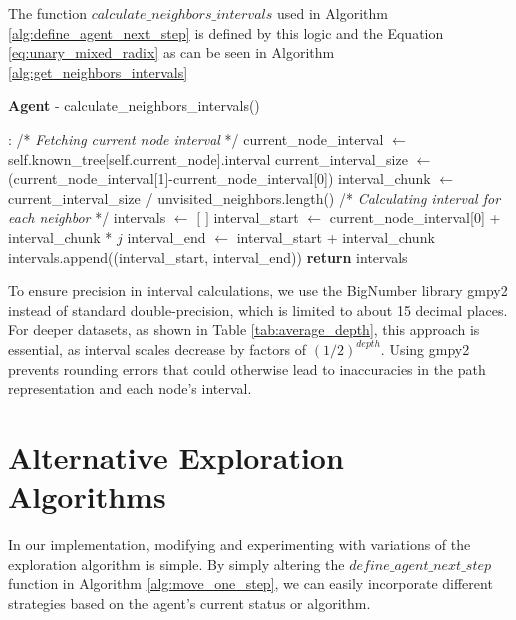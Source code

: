 The function $calculate\_neighbors\_intervals$ used in Algorithm \ref{alg:define_agent_next_step}
is defined by this logic and the Equation \ref{eq:unary_mixed_radix} as can be seen in Algorithm \ref{alg:get_neighbors_intervals}

\begin{algorithm}
\caption{\textbf{Agent} - calculate\_neighbors\_intervals()}
\label{alg:get_neighbors_intervals}
\begin{algorithmic}
    :
    \State /* \textit{Fetching current node interval } */
    \State current\_node\_interval $\gets$ self.known\_tree[self.current\_node].interval
    \State current\_interval\_size $\gets$ (current\_node\_interval[1]-current\_node\_interval[0])
    \State interval\_chunk $\gets$ current\_interval\_size / unvisited\_neighbors.length()
    \State
    \State /* \textit{Calculating interval for each neighbor} */
    \State intervals $\gets$ $[$ $ ]$
        \State interval\_start $\gets$ current\_node\_interval[0] + interval\_chunk * $j$
        \State interval\_end $\gets$ interval\_start + interval\_chunk
        \State intervals.append((interval\_start, interval\_end))
    \EndFor
    \State \textbf{return} intervals
    \EndProcedure
\end{algorithmic}
\end{algorithm}

To ensure precision in interval calculations, we use the BigNumber library gmpy2 \cite{Martelli2015} instead of standard double-precision, which is limited to about 15 decimal places. For deeper datasets, as shown in Table \ref{tab:average_depth}, this approach is essential, as interval scales decrease by factors of $(1/2)^{depth}$. Using gmpy2 prevents rounding errors that could otherwise lead to inaccuracies in the path representation and each node's interval.

\section{Alternative Exploration Algorithms}
\label{section_method_alt_exploration_alg}

In our implementation, modifying and experimenting with variations of the exploration algorithm is simple.
By simply altering the $define\_agent\_next\_step$ function in Algorithm \ref{alg:move_one_step}, we can easily incorporate different strategies based on the agent's current status or algorithm.

